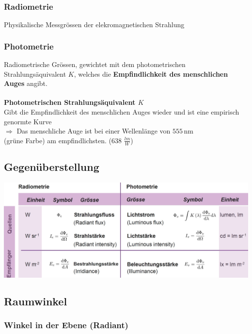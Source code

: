 \subsubsection{Radiometrie}
Physikalische Messgrössen der elekromagnetischen Strahlung


\subsubsection{Photometrie}
Radiometrische Grössen, gewichtet mit dem photometrischen Strahlungsäquivalent $K$, welches die \textbf{Empfindlichkeit des menschlichen Auges} angibt. \\
\\
\textbf{Photometrischen Strahlungsäquivalent $K$} \\
Gibt die Empfindlichkeit des menschlichen Auges wieder und ist eine empirisch genormte Kurve \\
$\Rightarrow$ Das menschliche Auge ist bei einer Wellenlänge von $555 \, \mathrm{nm}$ \\ (grüne Farbe) am empfindlichsten. (638 $\frac{lm}{W}$)




\subsection{Gegenüberstellung}

\includegraphics[width=\linewidth]{Bilder/Wellen-Optik/radiometrie_photometrie}




\subsection{Raumwinkel}

\subsubsection{Winkel in der Ebene (Radiant)}

